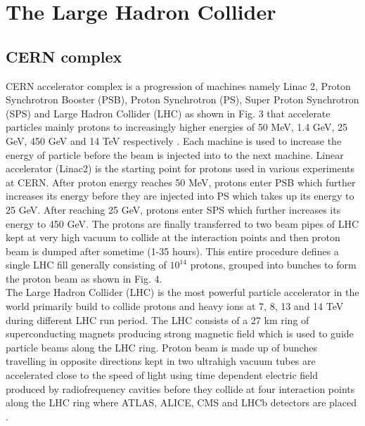 \section{The Large Hadron Collider}
\label{sec:lhc}

\subsection{CERN complex}

\onehalfspacing CERN accelerator complex is a progression of machines namely Linac 2, Proton Synchrotron Booster (PSB), Proton Synchrotron (PS), Super Proton Synchrotron (SPS) and Large Hadron Collider (LHC) as shown in Fig. 3 that accelerate particles mainly protons to increasingly higher energies of 50 MeV, 1.4 GeV, 25 GeV, 450 GeV and 14 TeV respectively \cite {CERNBrochure2017002Eng}. Each machine is used to increase the energy of particle before the beam is injected into to the next machine. Linear accelerator (Linac2) is the starting point for protons used in various experiments at CERN. After proton energy reaches 50 MeV, protons enter PSB which further increases its energy before they are injected into PS which takes up its energy to 25 GeV. After reaching 25 GeV, protons enter SPS which further increases its energy to 450 GeV. The protons are finally transferred to two beam pipes of LHC kept at very high vacuum to collide at the interaction points and then proton beam is dumped after sometime (1-35 hours). This entire procedure defines a single LHC fill generally consisting of $10^{14}$ protons, grouped into bunches to form the proton beam as shown in Fig. 4. \\ 

The Large Hadron Collider (LHC) is the most powerful particle accelerator in the world primarily build to collide protons and heavy ions at 7, 8, 13 and 14 TeV during different LHC run period. The LHC consists of a 27 km ring of superconducting magnets producing strong magnetic field which is used to guide particle beams along the LHC ring. Proton beam is made up of bunches travelling in opposite directions kept in two ultrahigh vacuum tubes are accelerated close to the speed of light using time dependent electric field produced by radiofrequency cavities before they collide at four interaction points along the LHC ring where ATLAS, ALICE, CMS and LHCb detectors are placed \cite {CERNBrochure2017002Eng}. \\


